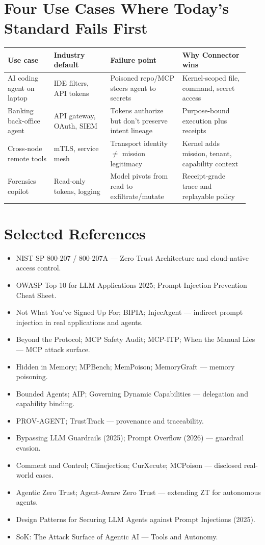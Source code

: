 \documentclass[10pt]{article}
\begin{document}
\section{Four Use Cases Where Today's Standard Fails First}
\begin{longtable}{@{}p{0.18\linewidth}p{0.22\linewidth}p{0.28\linewidth}p{0.26\linewidth}@{}}
\toprule
\textbf{Use case} & \textbf{Industry default} & \textbf{Failure point} & \textbf{Why Connector wins} \\
\midrule
\endhead
AI coding agent on laptop & IDE filters, API tokens & Poisoned repo/MCP steers agent to secrets & Kernel-scoped file, command, secret access \\
Banking back-office agent & API gateway, OAuth, SIEM & Tokens authorize but don't preserve intent lineage & Purpose-bound execution plus receipts \\
Cross-node remote tools & mTLS, service mesh & Transport identity $\neq$ mission legitimacy & Kernel adds mission, tenant, capability context \\
Forensics copilot & Read-only tokens, logging & Model pivots from read to exfiltrate/mutate & Receipt-grade trace and replayable policy \\
\bottomrule
\end{longtable}

\section{Selected References}
\begin{itemize}
  \item NIST SP 800-207 / 800-207A --- Zero Trust Architecture and cloud-native access control.
  \item OWASP Top 10 for LLM Applications 2025; Prompt Injection Prevention Cheat Sheet.
  \item Not What You've Signed Up For; BIPIA; InjecAgent --- indirect prompt injection in real applications and agents.
  \item Beyond the Protocol; MCP Safety Audit; MCP-ITP; When the Manual Lies --- MCP attack surface.
  \item Hidden in Memory; MPBench; MemPoison; MemoryGraft --- memory poisoning.
  \item Bounded Agents; AIP; Governing Dynamic Capabilities --- delegation and capability binding.
  \item PROV-AGENT; TrustTrack --- provenance and traceability.
  \item Bypassing LLM Guardrails (2025); Prompt Overflow (2026) --- guardrail evasion.
  \item Comment and Control; Clinejection; CurXecute; MCPoison --- disclosed real-world cases.
  \item Agentic Zero Trust; Agent-Aware Zero Trust --- extending ZT for autonomous agents.
  \item Design Patterns for Securing LLM Agents against Prompt Injections (2025).
  \item SoK: The Attack Surface of Agentic AI --- Tools and Autonomy.
\end{itemize}
\end{document}
